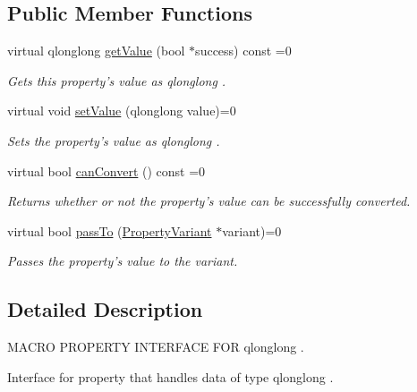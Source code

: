 \subsection*{Public Member Functions}
\begin{DoxyCompactItemize}
\item 
virtual qlonglong \hyperlink{class_i_long_long_property_a4364152258a2b085fa660ae34d106fdf}{get\-Value} (bool $\ast$success) const =0
\begin{DoxyCompactList}\small\item\em Gets this property's value as qlonglong . \end{DoxyCompactList}\item 
virtual void \hyperlink{class_i_long_long_property_a3ef096db3b5d53b1566148d9c78fcbbf}{set\-Value} (qlonglong value)=0
\begin{DoxyCompactList}\small\item\em Sets the property's value as qlonglong . \end{DoxyCompactList}\item 
virtual bool \hyperlink{class_i_long_long_property_a878b7753e3c53e966f9be8a3bd1e9b38}{can\-Convert} () const =0
\begin{DoxyCompactList}\small\item\em Returns whether or not the property's value can be successfully converted. \end{DoxyCompactList}\item 
virtual bool \hyperlink{class_i_long_long_property_a9134d0a324de1abf93ccd1bb866f06ad}{pass\-To} (\hyperlink{class_property_variant}{Property\-Variant} $\ast$variant)=0
\begin{DoxyCompactList}\small\item\em Passes the property's value to the variant. \end{DoxyCompactList}\end{DoxyCompactItemize}


\subsection{Detailed Description}
M\-A\-C\-R\-O P\-R\-O\-P\-E\-R\-T\-Y I\-N\-T\-E\-R\-F\-A\-C\-E F\-O\-R qlonglong . 

Interface for property that handles data of type qlonglong . 

